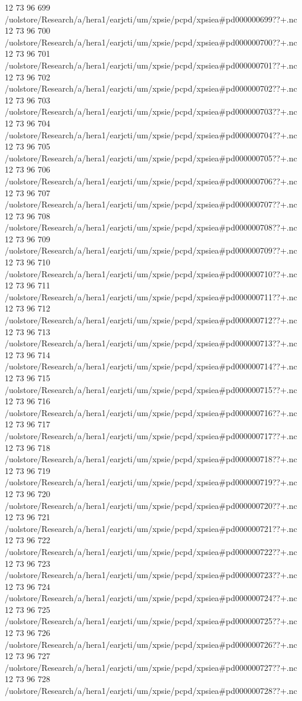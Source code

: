 12 73 96
699
/uolstore/Research/a/hera1/earjcti/um/xpsie/pcpd/xpsiea#pd000000699??+.nc
12 73 96
700
/uolstore/Research/a/hera1/earjcti/um/xpsie/pcpd/xpsiea#pd000000700??+.nc
12 73 96
701
/uolstore/Research/a/hera1/earjcti/um/xpsie/pcpd/xpsiea#pd000000701??+.nc
12 73 96
702
/uolstore/Research/a/hera1/earjcti/um/xpsie/pcpd/xpsiea#pd000000702??+.nc
12 73 96
703
/uolstore/Research/a/hera1/earjcti/um/xpsie/pcpd/xpsiea#pd000000703??+.nc
12 73 96
704
/uolstore/Research/a/hera1/earjcti/um/xpsie/pcpd/xpsiea#pd000000704??+.nc
12 73 96
705
/uolstore/Research/a/hera1/earjcti/um/xpsie/pcpd/xpsiea#pd000000705??+.nc
12 73 96
706
/uolstore/Research/a/hera1/earjcti/um/xpsie/pcpd/xpsiea#pd000000706??+.nc
12 73 96
707
/uolstore/Research/a/hera1/earjcti/um/xpsie/pcpd/xpsiea#pd000000707??+.nc
12 73 96
708
/uolstore/Research/a/hera1/earjcti/um/xpsie/pcpd/xpsiea#pd000000708??+.nc
12 73 96
709
/uolstore/Research/a/hera1/earjcti/um/xpsie/pcpd/xpsiea#pd000000709??+.nc
12 73 96
710
/uolstore/Research/a/hera1/earjcti/um/xpsie/pcpd/xpsiea#pd000000710??+.nc
12 73 96
711
/uolstore/Research/a/hera1/earjcti/um/xpsie/pcpd/xpsiea#pd000000711??+.nc
12 73 96
712
/uolstore/Research/a/hera1/earjcti/um/xpsie/pcpd/xpsiea#pd000000712??+.nc
12 73 96
713
/uolstore/Research/a/hera1/earjcti/um/xpsie/pcpd/xpsiea#pd000000713??+.nc
12 73 96
714
/uolstore/Research/a/hera1/earjcti/um/xpsie/pcpd/xpsiea#pd000000714??+.nc
12 73 96
715
/uolstore/Research/a/hera1/earjcti/um/xpsie/pcpd/xpsiea#pd000000715??+.nc
12 73 96
716
/uolstore/Research/a/hera1/earjcti/um/xpsie/pcpd/xpsiea#pd000000716??+.nc
12 73 96
717
/uolstore/Research/a/hera1/earjcti/um/xpsie/pcpd/xpsiea#pd000000717??+.nc
12 73 96
718
/uolstore/Research/a/hera1/earjcti/um/xpsie/pcpd/xpsiea#pd000000718??+.nc
12 73 96
719
/uolstore/Research/a/hera1/earjcti/um/xpsie/pcpd/xpsiea#pd000000719??+.nc
12 73 96
720
/uolstore/Research/a/hera1/earjcti/um/xpsie/pcpd/xpsiea#pd000000720??+.nc
12 73 96
721
/uolstore/Research/a/hera1/earjcti/um/xpsie/pcpd/xpsiea#pd000000721??+.nc
12 73 96
722
/uolstore/Research/a/hera1/earjcti/um/xpsie/pcpd/xpsiea#pd000000722??+.nc
12 73 96
723
/uolstore/Research/a/hera1/earjcti/um/xpsie/pcpd/xpsiea#pd000000723??+.nc
12 73 96
724
/uolstore/Research/a/hera1/earjcti/um/xpsie/pcpd/xpsiea#pd000000724??+.nc
12 73 96
725
/uolstore/Research/a/hera1/earjcti/um/xpsie/pcpd/xpsiea#pd000000725??+.nc
12 73 96
726
/uolstore/Research/a/hera1/earjcti/um/xpsie/pcpd/xpsiea#pd000000726??+.nc
12 73 96
727
/uolstore/Research/a/hera1/earjcti/um/xpsie/pcpd/xpsiea#pd000000727??+.nc
12 73 96
728
/uolstore/Research/a/hera1/earjcti/um/xpsie/pcpd/xpsiea#pd000000728??+.nc
